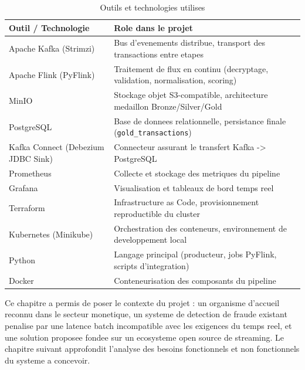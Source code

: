 \begin{table}[H]
\centering
\renewcommand{\arraystretch}{1.3}
\begin{tabularx}{\textwidth}{@{} l X @{}}
\toprule
\textbf{Outil / Technologie} & \textbf{Role dans le projet} \\
\midrule
Apache Kafka (Strimzi) & Bus d'evenements distribue, transport des transactions entre etapes \\
\rowcolor{gray!6}
Apache Flink (PyFlink) & Traitement de flux en continu (decryptage, validation, normalisation, scoring) \\
MinIO & Stockage objet S3-compatible, architecture medaillon Bronze/Silver/Gold \\
\rowcolor{gray!6}
PostgreSQL & Base de donnees relationnelle, persistance finale (\texttt{gold\_transactions}) \\
Kafka Connect (Debezium JDBC Sink) & Connecteur assurant le transfert Kafka -> PostgreSQL \\
\rowcolor{gray!6}
Prometheus & Collecte et stockage des metriques du pipeline \\
Grafana & Visualisation et tableaux de bord temps reel \\
\rowcolor{gray!6}
Terraform & Infrastructure as Code, provisionnement reproductible du cluster \\
Kubernetes (Minikube) & Orchestration des conteneurs, environnement de developpement local \\
\rowcolor{gray!6}
Python & Langage principal (producteur, jobs PyFlink, scripts d'integration) \\
Docker & Conteneurisation des composants du pipeline \\
\bottomrule
\end{tabularx}
\caption{Outils et technologies utilises}
\label{tab:outils-ch1}
\end{table}

\conclusionchapitre

Ce chapitre a permis de poser le contexte du projet : un organisme d'accueil reconnu
dans le secteur monetique, un systeme de detection de fraude existant penalise par une
latence batch incompatible avec les exigences du temps reel, et une solution proposee
fondee sur un ecosysteme open source de streaming. Le chapitre suivant approfondit
l'analyse des besoins fonctionnels et non fonctionnels du systeme a concevoir.
